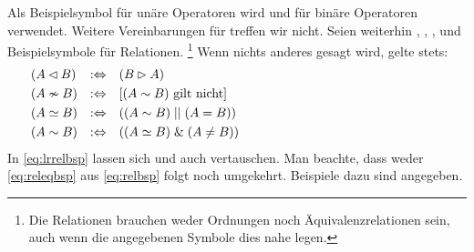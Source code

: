 Als Beispielsymbol für unäre Operatoren wird \chrqt{$\opubsp$} und für binäre Operatoren \chrqt{$\opbsp$} verwendet.
Weitere Vereinbarungen für \chrqt{$\opubsp$} treffen wir nicht.
Seien weiterhin , , ,  und  Beispielsymbole für Relationen.%
\footnote{%
	Die Relationen brauchen weder Ordnungen noch Äquivalenzrelationen sein, auch wenn die angegebenen Symbole dies nahe legen.
}
Wenn nichts anderes gesagt wird, gelte stets:
%
\begin{align}
	& (A \lhd   B) & :\Leftrightarrow & \quad  (B \rhd   A)
	\label{eq:lrrelbsp}   \\
	& (A \nsim  B)  & :\Leftrightarrow & \quad [(A \sim   B) \text{ gilt nicht}]
	\label{eq:relnbsp}    \\
	& (A \simeq  B) & :\Leftrightarrow & \quad ((A \sim   B) \;||\;  (A = B))
	\label{eq:releqbsp}   \\
	& (A \sim B)    & :\Leftrightarrow & \quad ((A \simeq B) \;\&\; (A \ne B))
	\label{eq:relbsp}    &&&&&&&&&&&&&&&&&&&&&&&&&&&&&&
\end{align}
%
In \eqref{eq:lrrelbsp} lassen sich \chrqt{$\lrelbsp$} und \chrqt{$\rrelbsp$} auch vertauschen.
Man beachte, dass weder \eqref{eq:releqbsp} aus \eqref{eq:relbsp} folgt noch umgekehrt.
Beispiele dazu sind  angegeben.

